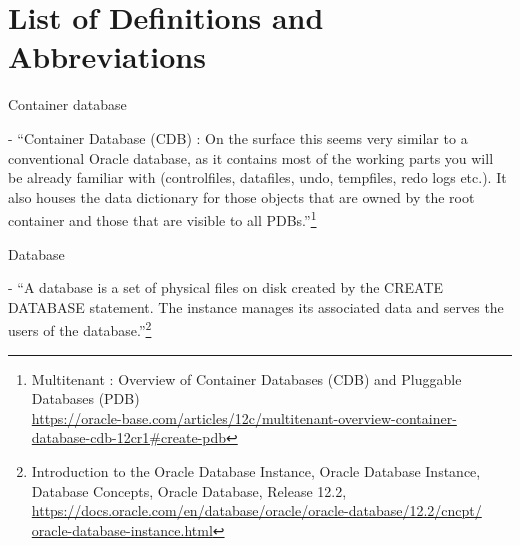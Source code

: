 

\newpage
\setcounter{secnumdepth}{0}
\section{List of Definitions and Abbreviations}

\noindent\begin{itemize*}

\item{\begin{bf}Container database\end{bf}} - ``Container Database (CDB) : On 
the surface this seems very similar to a conventional Oracle database, as it 
contains most of the working parts you will be already familiar with 
(controlfiles, datafiles, undo, tempfiles, redo logs etc.). It also houses 
the data dictionary for those objects that are owned by the root container 
and those that are visible to all PDBs.''\footnote{Multitenant : Overview of Container Databases (CDB) and Pluggable Databases (PDB)\\
\href{https://oracle-base.com/articles/12c/multitenant-overview-container-database-cdb-12cr1\#create-pdb}{https://oracle-base.com/articles/12c/multitenant-overview-container-database-cdb-12cr1\#create-pdb}}



\item{\begin{bf}Database\end{bf}} - ``A database is a set of physical
  files on disk created by the CREATE DATABASE statement. The instance
  manages its associated data and serves the users of the database.''\footnote{Introduction to the Oracle Database Instance, Oracle Database Instance, Database Concepts, Oracle Database,
    Release 12.2,
    \href{https://docs.oracle.com/en/database/oracle/oracle-database/12.2/cncpt/oracle-database-instance.html}{https://docs.oracle.com/en/database/oracle/oracle-database/12.2/cncpt/}\newline
  \href{http://www.google.com}{oracle-database-instance.html}}


\end{itemize*}
